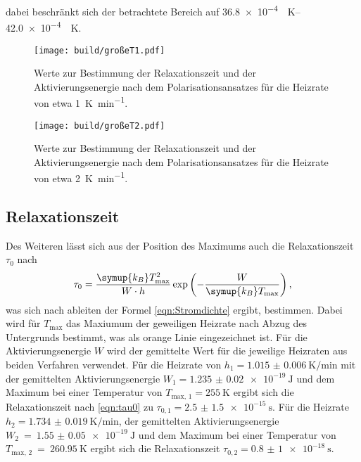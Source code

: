 dabei beschränkt sich der betrachtete Bereich auf \SIrange{36.8e-4}{42.0e-4}{\per\kelvin}.
\begin{figure}[htb]
  \centering
  \texttt{[image: build/großeT1.pdf]}
  \caption{Werte zur Bestimmung der Relaxationszeit und der Aktivierungsenergie nach dem Polarisationsansatzes für die Heizrate von etwa \SI{1}{\kelvin\per\minute}.}
  \label{fig:grT1}
\end{figure}
\begin{figure}[htb]
  \centering
  \texttt{[image: build/großeT2.pdf]}
  \caption{Werte zur Bestimmung der Relaxationszeit und der Aktivierungsenergie nach dem Polarisationsansatzes für die Heizrate von etwa \SI{2}{\kelvin\per\minute}.}
  \label{fig:grT2}
\end{figure}

\subsection{Relaxationszeit}
\label{sec:relax}
Des Weiteren lässt sich aus der Position des Maximums auch die Relaxationszeit $\tau_0$ nach
\begin{equation}
    \label{eqn:tau0}
    \tau_0 = \frac{\symup{k_B}T_\text{max}^2}{W \cdot h} \exp\left(-\frac{W}{\symup{k_B}T_\text{max}} \right),
\end{equation}
was sich nach ableiten der Formel \eqref{eqn:Stromdichte} ergibt, bestimmen. Dabei wird für $T_\text{max}$ das Maxiumum der geweiligen Heizrate nach Abzug
des Untergrunds bestimmt, was als orange Linie eingezeichnet ist.
Für die Aktivierungsenergie $W$ wird der gemittelte Wert für die jeweilige Heizraten aus beiden Verfahren verwendet.
Für die Heizrate von $h_1=\SI{1.015(6)}{\kelvin\per\minute}$ mit der gemittelten Aktivierungsenergie $W_1=\SI{1.235(20)e-19}{\joule}$ und dem 
Maximum bei einer Temperatur von $T_\text{max, 1}=\SI{255}{\kelvin}$ ergibt sich die Relaxationszeit nach \eqref{eqn:tau0} zu $\tau_{0,1}=\SI{2.5(15)e-15}{\second}$. 
Für die Heizrate $h_2=\SI{1.734(19)}{\kelvin\per\minute}$, der gemittelten Aktivierungsenergie $W_2~=~\SI{1.55(5)e-19}{\joule}$ und dem 
Maximum bei einer Temperatur von $T_\text{max, 2}~=~\SI{260.95}{\kelvin}$ ergibt sich die Relaxationszeit $\tau_{0,2}=\SI{0.8(10)e-18}{\second}$.


\FloatBarrier